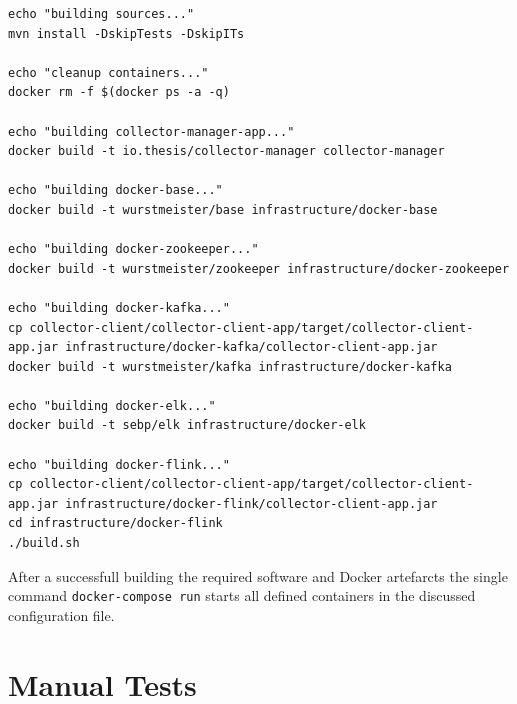 \begin{lstlisting}[caption={build-docker-images-sh}, captionpos=b, label={lst:docker-build-images}]
echo "building sources..."
mvn install -DskipTests -DskipITs

echo "cleanup containers..."
docker rm -f $(docker ps -a -q)

echo "building collector-manager-app..."
docker build -t io.thesis/collector-manager collector-manager

echo "building docker-base..."
docker build -t wurstmeister/base infrastructure/docker-base

echo "building docker-zookeeper..."
docker build -t wurstmeister/zookeeper infrastructure/docker-zookeeper

echo "building docker-kafka..."
cp collector-client/collector-client-app/target/collector-client-app.jar infrastructure/docker-kafka/collector-client-app.jar
docker build -t wurstmeister/kafka infrastructure/docker-kafka

echo "building docker-elk..."
docker build -t sebp/elk infrastructure/docker-elk

echo "building docker-flink..."
cp collector-client/collector-client-app/target/collector-client-app.jar infrastructure/docker-flink/collector-client-app.jar
cd infrastructure/docker-flink
./build.sh
\end{lstlisting}

After a successfull building the required software and Docker artefarcts the single command \verb|docker-compose run| starts all
defined containers in the discussed configuration file.

\section{Manual Tests}

